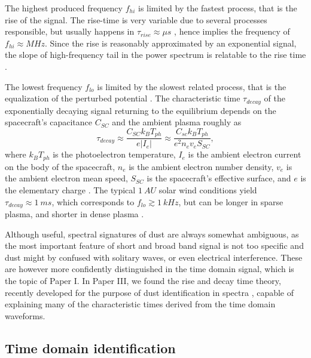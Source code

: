 The highest produced frequency $f_{hi}$ is limited by the fastest process, that is the rise of the signal. The rise-time is very variable due to several processes responsible, but usually happens in $\tau_{rise} \approx \si{\mu s}$ \citep{meyer2017frequency,shen2023variability}, hence implies the frequency of $f_{hi} \approx \si{M Hz}$. Since the rise is reasonably approximated by an exponential signal, the slope of high-frequency tail in the power spectrum is relatable to the rise time \citep{meyer2017frequency}. 

The lowest frequency $f_{lo}$ is limited by the slowest related process, that is the equalization of the perturbed potential \citep{zaslavsky2015floating}. The characteristic time $\tau_{decay}$ of the exponentially decaying signal returning to the equilibrium depends on the spacecraft's capacitance $C_{SC}$ and the ambient plasma roughly as 
\begin{equation}    
\tau_{decay} \approx \frac{C_{SC} k_B T_{ph}}{e|I_{e}|} \approx \frac{C_{sc} k_B T_{ph}}{e^2 n_e v_e S_{SC}}, 
\end{equation}
where $k_B T_{ph}$ is the photoelectron temperature, $I_e$ is the ambient electron current on the body of the spacecraft, $n_e$ is the ambient electron number density, $v_e$ is the ambient electron mean speed, $S_{SC}$ is the spacecraft's effective surface, and $e$ is the elementary charge \citep{henri2011observations}. The typical $\SI{1}{AU}$ solar wind conditions yield $\tau_{decay} \approx \SI{1}{m s}$, which corresponds to $f_{lo} \gtrsim \SI{1}{kHz}$, but can be longer in sparse plasma, and shorter in dense plasma \citep{zaslavsky2015floating,vaverka2017detection,meyer2017frequency}. 

Although useful, spectral signatures of dust are always somewhat ambiguous, as the most important feature of short and broad band signal is not too specific and dust might by confused with solitary waves, or even electrical interference. These are however more confidently distinguished in the time domain signal, which is the topic of Paper I. In Paper III, we found the rise and decay time theory, recently developed for the purpose of dust identification in spectra \citep{meyer2017frequency}, capable of explaining many of the characteristic times derived from the time domain waveforms.

\subsection{Time domain identification}

